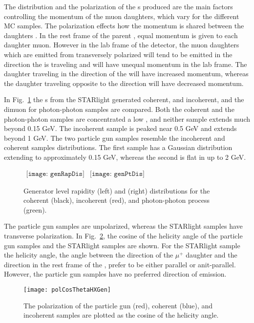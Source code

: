     The \pt{} distribution and the polarization of the \JPsi{}s produced are 
      the main factors controlling the momentum of the muon daughters, which
      vary for the different MC samples. 
    The polarization effects how the momentum is shared between the daughters
      \cite{oniaPol}.
    In the rest frame of the parent \JPsi{}, equal momentum is given to each 
      daughter muon. 
    However in the lab frame of the detector, the muon daughters which are 
      emitted from transversely polarized \JPsi{} will tend to be emitted in
      the direction the \JPsi{} is traveling and will have unequal momentum in 
      the lab frame.
    The daughter traveling in the direction of the \JPsi{} will have increased
      momentum, whereas the daughter traveling opposite to the \JPsi{} 
      direction will have decreased momentum. 

    In Fig.~\ref{fig:starlightRapPtDist} the \JPsi{}s \pt{} from the 
      STARlight generated coherent, and incoherent, and the dimuon \pt{} for 
      photon-photon samples are compared.
    Both the coherent and the photon-photon samples are concentrated a low 
      \pt{}, and neither sample extends much beyond 0.15 GeV.
    The incoherent sample is peaked near 0.5 GeV and extends beyond 1 GeV.
    The two particle gun samples resemble the incoherent and coherent samples
      \pt{} distributions.
    The first sample has a Gaussian \pt{} distribution extending to 
      approximately 0.15 GeV, whereas the second is flat in \pt{} up to
      2 GeV.
    \begin{figure}[!Hhbt]
      \centering
      $ \begin{array}{cc}
        \texttt{[image: genRapDis]} &
        \texttt{[image: genPtDis]}
      \end{array} $
      \caption{Generator level rapidity (left) and \pt{} (right) 
          distributions for the coherent (black), incoherent (red), 
          and photon-photon process (green).}
      \label{fig:starlightRapPtDist}
    \end{figure}

    The particle gun samples are unpolarized, whereas the STARlight samples 
      have transverse polarization.
    In Fig.~\ref{fig:genHXAngle}, the cosine of the helicity angle of the 
      particle gun samples and the STARlight samples are shown.
    For the STARlight sample the helicity angle, the angle between the 
      direction of the $\mu^{+}$ daughter and the \JPsi{} direction in the rest
      frame of the \JPsi{}, prefer to be either parallel or anit-parallel.
    However, the particle gun samples have no preferred direction of emission.
    \begin{figure}[!Hhbt]
      \centering
      \texttt{[image: polCosThetaHXGen]}
      \caption{ The \JPsi{} polarization of the particle gun (red),
        coherent (blue), and incoherent samples are plotted as the
        cosine of the helicity angle.} 
      \label{fig:genHXAngle}
    \end{figure}

